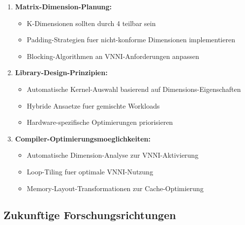 \documentclass[11pt,a4paper]{article}
\begin{document}
\begin{enumerate}
\item \textbf{Matrix-Dimension-Planung:}
   \begin{itemize}
   \item K-Dimensionen sollten durch 4 teilbar sein
   \item Padding-Strategien fuer nicht-konforme Dimensionen implementieren
   \item Blocking-Algorithmen an VNNI-Anforderungen anpassen
   \end{itemize}

\item \textbf{Library-Design-Prinzipien:}
   \begin{itemize}
   \item Automatische Kernel-Auswahl basierend auf Dimensions-Eigenschaften
   \item Hybride Ansaetze fuer gemischte Workloads
   \item Hardware-spezifische Optimierungen priorisieren
   \end{itemize}

\item \textbf{Compiler-Optimierungsmoeglichkeiten:}
   \begin{itemize}
   \item Automatische Dimension-Analyse zur VNNI-Aktivierung
   \item Loop-Tiling fuer optimale VNNI-Nutzung
   \item Memory-Layout-Transformationen zur Cache-Optimierung
   \end{itemize}
\end{enumerate}

\subsection{Zukunftige Forschungsrichtungen}
\end{document}
